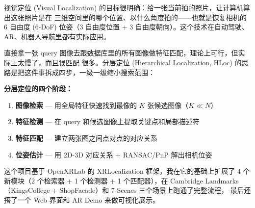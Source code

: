 \documentclass[12pt,a4paper]{ctexart}
\begin{document}
视觉定位 (Visual Localization) 的目标很明确：给一张当前拍的照片，让计算机算出这张照片是在
三维空间里的哪个位置、以什么角度拍的——也就是恢复相机的 6 自由度 (6-DoF) 位姿（3 自由度位置 +
3 自由度朝向）。这个技术在自动驾驶、AR、机器人导航里都有实际应用。

直接拿一张 query 图像去跟数据库里的所有图像做特征匹配，理论上可行，但实际上太慢了，而且误匹配
很多。分层定位 (Hierarchical Localization, HLoc) 的思路是把这件事拆成四步，一级一级缩小搜索范围：

\begin{methodbox}
\textbf{分层定位的四个阶段：}
\begin{enumerate}
  \item \textbf{图像检索} — 用全局特征快速找到最像的 $K$ 张候选图像（$K \ll N$）
  \item \textbf{特征检测} — 在 query 和候选图像上提取关键点和局部描述符
  \item \textbf{特征匹配} — 建立两张图之间点对点的对应关系
  \item \textbf{位姿估计} — 用 2D-3D 对应关系 + RANSAC/PnP 解出相机位姿
\end{enumerate}
\end{methodbox}

这个项目基于 OpenXRLab 的 XRLocalization 框架，我在它的基础上扩展了 4 个新模块（2 个检索器 +
1 个检测器 + 1 个匹配器），在 Cambridge Landmarks（KingsCollege + ShopFacade）和 7-Scenes 三个场景上跑通了完整流程，
最后还搭了一个 Web 界面和 AR Demo 来做可视化展示。
\end{document}
